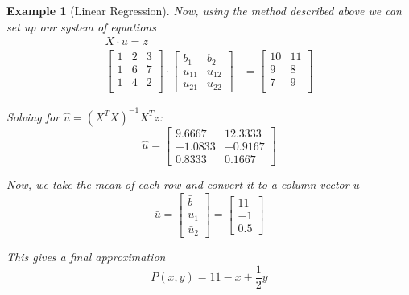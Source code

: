 \documentclass{book}
\newtheorem{example}{Example}[chapter]
\begin{document}
\begin{example}[Linear Regression]
    Now, using the method described above we can set up our system of equations
    \begin{equation}
        \begin{split}
            X\cdot u = z \\[1em]
            \begin{bmatrix}
                1 & 2 & 3 \\
                1 & 6 & 7 \\
                1 & 4 & 2 \\
            \end{bmatrix}
            \cdot
            \begin{bmatrix}
                b_1    & b_2    \\
                u_{11} & u_{12} \\
                u_{21} & u_{22}
            \end{bmatrix}
            &=
            \begin{bmatrix}
                10 & 11 \\
                9  & 8  \\
                7  & 9  \\
            \end{bmatrix}
        \end{split}
    \end{equation}

    Solving for $\hat{u} = \left(X^{T}X\right)^{-1}X^{T}z$:
    \[
        \hat{u} =
        \begin{bmatrix}
            9.6667  & 12.3333 \\
            -1.0833 & -0.9167 \\
            0.8333  & 0.1667
        \end{bmatrix}
    \]

    Now, we take the mean of each row and convert it to a column vector $\bar{u}$
    \[
        \bar{u} = \left[
            \begin{matrix}
                \bar{b} \\\bar{u}_1\\\bar{u}_2
            \end{matrix}
            \right] = \left[
            \begin{matrix}
                11 \\ -1 \\ 0.5
            \end{matrix}
            \right]
    \]

    This gives a final approximation
    \[
        P(x, y) = 11 - x + \dfrac{1}{2}y
    \]
\end{example}
\end{document}
